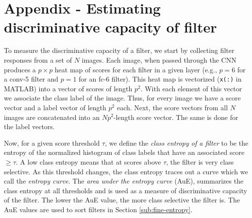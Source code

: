 \section*{Appendix - Estimating discriminative capacity of filter}
\label{sub:app-entropy}
To measure the discriminative capacity of a filter, we start by collecting filter responses from a set of $N$ images.
Each image, when passed through the CNN produces a $p \times p$ heat map of scores for each filter in a given layer (e.g., $p = 6$ for a conv-5 filter and $p = 1$ for an fc-6 filter).
This heat map is vectorized (\texttt{x(:)} in MATLAB) into a vector of scores of length $p^2$. With each element of this vector we associate the class label of the image. 
Thus, for every image we have a score vector and a label vector of length $p^2$ each.
Next, the score vectors from all $N$ images are concatenated into an $Np^2$-length score vector.
The same is done for the label vectors.

Now, for a given score threshold $\tau$, we define the \emph{class entropy of a filter} to be the entropy of the normalized histogram of class labels that have an associated score $\geq \tau$.
A low class entropy means that at scores above $\tau$, the filter is very class selective.
As this threshold changes, the class entropy traces out a curve which we call the \emph{entropy curve}.
The \emph{area under the entropy curve} (AuE), summarizes the class entropy at all thresholds and is used as a measure of discriminative capacity of the filter. 
The lower the AuE value, the more class selective the filter is.
The AuE values are used to sort filters in Section \ref{sub:fine-entropy}.



